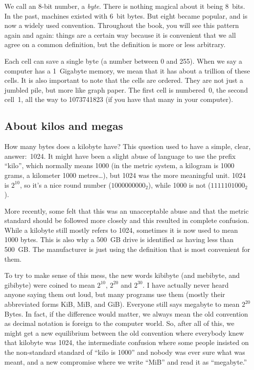 We call an 8-bit number, a \emph{byte}. There is nothing magical about it being
8~bits. In the past, machines existed with 6~bit bytes. But eight became
popular, and is now a widely used convention. Throughout the book, you will see
this pattern again and again: things are a certain way because it is convenient
that we all agree on a common definition, but the definition is more or less
arbitrary.

Each cell can save a single byte (a number between 0 and 255). When we say a
computer has a 1~Gigabyte memory, we mean that it has about a trillion of these
cells. It is also important to note that the cells are ordered. They are not
just a jumbled pile, but more like graph paper. The first cell is numbered~0,
the second cell~1, all the way to 1073741823 (if you have that many in your
computer).

\subsection{About kilos and megas}

How many bytes does a kilobyte have? This question used to have a simple,
clear, answer:~1024. It might have been a slight abuse of language to use the
prefix ``kilo'', which normally means 1000 (in the metric system, a kilogram is
1000 grams, a kilometer 1000 metres\ldots), but 1024 was the more meaningful
unit. 1024 is $2^{10}$, so it's a nice round number ($1000000000_2$), while
1000 is not ($1111101000_2$).

More recently, some felt that this was an unacceptable abuse and that the
metric standard should be followed more closely and this resulted in complete
confusion. While a kilobyte still mostly refers to 1024, sometimes it is now
used to mean 1000 bytes. This is also why a 500~GB drive is identified as
having less than 500~GB. The manufacturer is just using the definition that is
most convenient for them.

To try to make sense of this mess, the new words kibibyte (and mebibyte, and
gibibyte) were coined to mean $2^{10}$, $2^{20}$ and $2^{30}$. I have actually
never heard anyone saying them out loud, but many programs use them
(mostly their abbreviated forms KiB, MiB, and GiB). Everyone still says
megabyte to mean $2^{20}$ Bytes. In fact, if the difference would matter, we
always mean the old convention as decimal notation is foreign to the computer
world. So, after all of this, we might get a new equilibrium between the old
convention where everybody knew that kilobyte was 1024, the intermediate
confusion where some people insisted on the non-standard standard of ``kilo is
1000'' and nobody was ever sure what was meant, and a new compromise where we
write ``MiB'' and read it as ``megabyte.''

